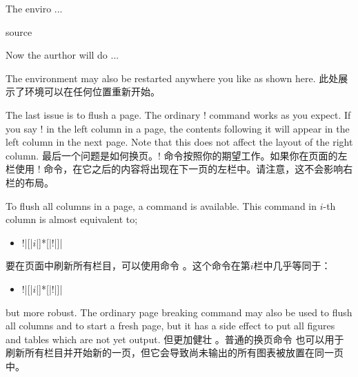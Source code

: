 \begin{paracol}{3}
\begin{VerbatimII}
\begin{paracol}{2}
\begin{leftcolumn}
The enviro ... 
\end{leftcolumn}
\begin{rightcolumn}
source
\end{rightcolumn}
\end{paracol}
Now the aurthor will do ...
\end{VerbatimII}
\switchcolumn

\switchcolumn[1]
The environment may also be restarted anywhere you like as shown here.
\switchcolumn
此处展示了环境可以在任何位置重新开始。

\switchcolumn[1]
The last issue is to flush a page.  The ordinary \!\newpage! command works
as you expect.  If you say \!\newpage! in the left column in a page, the
contents following it will appear in the left column in the next page.  Note
that this does not affect the layout of the right column.
\switchcolumn
最后一个问题是如何换页。\!\newpage! 命令按照你的期望工作。如果你在页面的左栏使用 \!\newpage! 命令，在它之后的内容将出现在下一页的左栏中。请注意，这不会影响右栏的布局。

\switchcolumn[1]
To flush all columns in a page, a command \Uidx{\!\flushpage!} is
available.  This command in $i$-th column is almost equivalent to;
\begin{itemize}\item[]
\!\switchcolumn!|[|$i$|]*[|\!\newpage!|]|
\end{itemize}
\switchcolumn
要在页面中刷新所有栏目，可以使用命令 \Uidx{\!\flushpage!}。这个命令在第$i$栏中几乎等同于：
\begin{itemize}\item[]
\!\switchcolumn!|[|$i$|]*[|\!\newpage!|]|
\end{itemize}

\switchcolumn[1]
but more robust\footnotemark\label{fn:flush}.
The ordinary page breaking command \Uidx{\!\clearpage!} may also be used
to flush all columns and to start a fresh page, but it has a side effect
to put all figures and tables which are not yet output.
\switchcolumn
但更加健壮 \footnotemark\label{fn:flush} 。普通的换页命令 \Uidx{\!\clearpage!} 也可以用于刷新所有栏目并开始新的一页，但它会导致尚未输出的所有图表被放置在同一页中。
\end{paracol}

